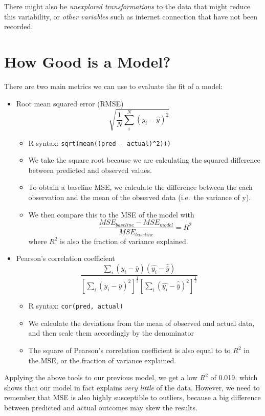 There might also be \emph{unexplored transformations} to the data that might reduce this variability, or \emph{other variables} such as internet connection that have not been recorded.

\section{How Good is a Model?}

There are two main metrics we can use to evaluate the fit of a model:
\begin{itemize}
\item Root mean squared error (RMSE)\[\sqrt{\frac{1}{N}\sum_{i}^{N}(y_i-\hat{y})^2}\]\begin{itemize}
\item R syntax: \texttt{sqrt(mean((pred\ -\ actual)\^{}2)))}
\item We take the square root because we are calculating the squared difference between predicted and observed values.
\item To obtain a baseline MSE, we calculate the difference between the each observation and the mean of the observed data (i.e.~the variance of y).
\item We then compare this to the MSE of the model with \[\frac{MSE_{baseline} - MSE_{model}}  {MSE_{baseline}} = R^2\] where \(R^2\) is also the fraction of variance explained.
\end{itemize}
\item Pearson's correlation coefficient \[\frac{\sum_i(y_i-\bar{y})(\hat{y_i}-\hat{\bar{y}})}{[\sum_i(y_i-\bar{y})^2]^\frac{1}{2}[\sum_i(\hat{y_i}-\hat{\bar{y}})^2]^\frac{1}{2}}\]\begin{itemize}
\item R syntax: \texttt{cor(pred,\ actual)}
\item We calculate the deviations from the mean of observed and actual data, and then scale them accordingly by the denominator
\item The square of Pearson's correlation coefficient is also equal to to \(R^2\) in the MSE, or the fraction of variance explained.\end{itemize}
\end{itemize}

Applying the above tools to our previous model, we get a low \(R^2\) of 0.019, which shows that our model in fact explains \emph{very little} of the data. However, we need to remember that MSE is also highly susceptible to outliers, because a big difference between predicted and actual outcomes may skew the results.

